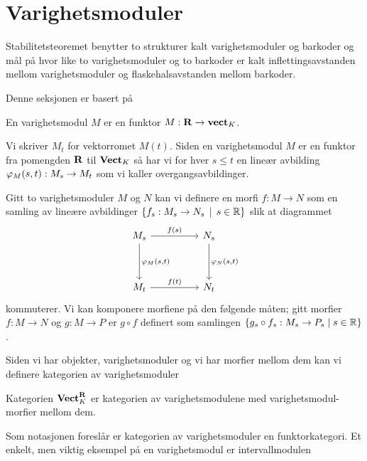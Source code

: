 \section{Varighetsmoduler}\label{sek:VarMod}


Stabilitetsteoremet benytter to strukturer kalt
varighetsmoduler og barkoder og mål på hvor like to
varighetsmoduler og to barkoder er kalt
inflettingsavstanden mellom varighetsmoduler og
flaskehalsavstanden mellom barkoder.

Denne seksjonen er basert på \citep[seksjon 2.1]{Bauer2015}
\begin{definisjon}\label{Def:PersMod}
    En varighetsmodul $M$ er en funktor $M:\textnormal{\textbf{{R}}}\to\textnormal{\textbf{vect}}_K$.
\end{definisjon}

Vi skriver $M_t$ for vektorromet $M(t)$. Siden en varighetsmodul $M$ er en funktor fra pomengden $\textnormal{\textbf{{R}}}$ til $\textnormal{\textbf{Vect}}_K$ så har vi for hver $s\leq t$ en lineær avbilding $\varphi_M(s,t): M_s\to M_t$ som vi kaller overgangsavbildinger.

Gitt to varighetsmoduler $M$ og $N$ kan vi definere en morfi $f: M\to N$ som en samling av lineære avbildinger
$\left\{f_s: M_s\to N_s\,\mid\,s\in\mathbb{R}\right\}$ slik at diagrammet
\[
\begin{tikzcd}
	{M_s} && {N_s} \\
	\\
	{M_t} && {N_t}
	\arrow["{f(s)}", from=1-1, to=1-3]
	\arrow["{\p_M(s,t)}", from=1-1, to=3-1]
	\arrow["{\p_N(s,t)}", from=1-3, to=3-3]
	\arrow["{f(t)}", from=3-1, to=3-3]
\end{tikzcd}
\]
kommuterer. Vi kan komponere morfiene på den følgende måten; gitt morfier $f:M\to N$ og $g:M\to P$ er $g\circ f$ definert som samlingen $\{g_s\circ f_s: M_s\to P_s\;|\;s\in\mathbb{R}\}$.

Siden vi har objekter, varighetsmoduler og vi har morfier mellom dem kan vi definere kategorien av varighetsmoduler

\begin{definisjon}\label{Def:KatPMod}
    Kategorien $\textnormal{\textbf{Vect}}_K^{\textnormal{\textbf{{R}}}}$ er kategorien av varighetsmodulene med varighetsmodul-morfier mellom dem.
\end{definisjon}

Som notasjonen foreslår er kategorien av varighetsmoduler en funktorkategori.
Et enkelt, men viktig eksempel på en varighetsmodul er intervallmodulen

